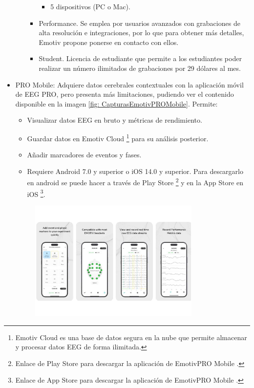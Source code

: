 \begin{itemize}
\begin{itemize}
\begin{itemize}
\begin{itemize}
                \item 5 dispositivos (PC o Mac).
            \end{itemize}
            \item Performance. Se emplea por usuarios avanzados con grabaciones de alta resolución e integraciones, por lo que para obtener más detalles, Emotiv propone ponerse en contacto con ellos.
            \item Student. Licencia de estudiante que permite a los estudiantes poder realizar un número ilimitados de grabaciones por 29 dólares al mes.
        \end{itemize}
    \end{itemize}
    \item PRO Mobile: Adquiere datos cerebrales contextuales con la aplicación móvil de EEG PRO, pero presenta más limitaciones, pudiendo ver el contenido disponible en la imagen \ref{fig: CapturasEmotivPROMobile}. Permite:
    \begin{itemize}
        \item Visualizar datos EEG en bruto y métricas de rendimiento.
        \item Guardar datos en Emotiv Cloud \footnote{Emotiv Cloud es una base de datos segura en la nube que permite almacenar y procesar datos EEG de forma ilimitada.} para su análisis posterior.
        \item Añadir marcadores de eventos y fases.
        \item Requiere Android 7.0 y superior o iOS 14.0 y superior. Para descargarlo en android se puede hacer a través de Play Store \cite{EmotivPROMobileAndroid}\footnote{Enlace de Play Store para descargar la aplicación de EmotivPRO Mobile \cite{EmotivPROMobileAndroid}.} y en la App Store en iOS \cite{EmotivPROMobileIOS}\footnote{Enlace de App Store para descargar la aplicación de EmotivPRO Mobile \cite{EmotivPROMobileIOS}.}.
    \end{itemize}
    \begin{figure}[H]
    \centering
    \includegraphics[width=0.8\textwidth]{img/CapturasEmotivPROMobile.pdf}

\end{figure}
\end{itemize}
